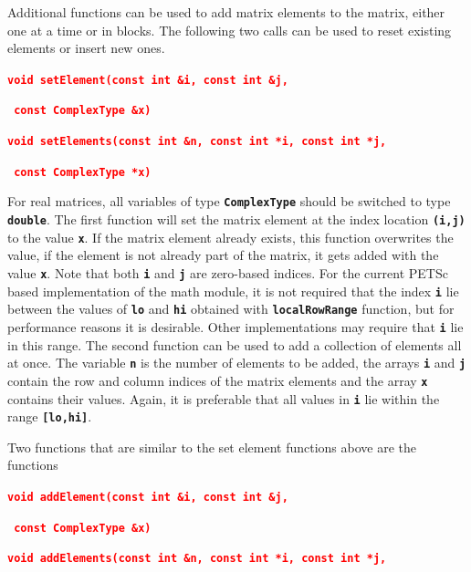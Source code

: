 \documentclass[12pt]{report} %
\begin{document}
Additional functions can be used to add matrix elements to the matrix, either one at a time or in blocks. The following two calls can be used to reset existing elements or insert new ones.

\textcolor{red}{\texttt{\textbf{void setElement(const int \&i, const int \&j,}}}

\textcolor{red}{\texttt{\textbf{                const ComplexType \&x)}}}

\textcolor{red}{\texttt{\textbf{}}}

\textcolor{red}{\texttt{\textbf{void setElements(const int \&n, const int *i, const int *j,}}}

\textcolor{red}{\texttt{\textbf{                 const ComplexType *x)}}}

For real matrices, all variables of type \texttt{\textbf{ComplexType}} should be switched to type \texttt{\textbf{double}}. The first function will set the matrix element at the index location \texttt{\textbf{(i,j)}} to the value \texttt{\textbf{x}}. If the matrix element already exists, this function overwrites the value, if the element is not already part of the matrix, it gets added with the value \texttt{\textbf{x}}. Note that both \texttt{\textbf{i}} and \texttt{\textbf{j}} are zero-based indices. For the current PETSc based implementation of the math module, it is not required that the index \texttt{\textbf{i}} lie between the values of \texttt{\textbf{lo}} and \texttt{\textbf{hi}} obtained with \texttt{\textbf{localRowRange}} function, but for performance reasons it is desirable. Other implementations may require that \texttt{\textbf{i}} lie in this range. The second function can be used to add a collection of elements all at once. The variable \texttt{\textbf{n}} is the number of elements to be added, the arrays \texttt{\textbf{i}} and \texttt{\textbf{j}} contain the row and column indices of the matrix elements and the array \texttt{\textbf{x}} contains their values. Again, it is preferable that all values in \texttt{\textbf{i}} lie within the range \texttt{\textbf{[lo,hi]}}.

Two functions that are similar to the set element functions above are the functions

\textcolor{red}{\texttt{\textbf{void addElement(const int \&i, const int \&j,}}}

\textcolor{red}{\texttt{\textbf{                const ComplexType \&x)}}}

\textcolor{red}{\texttt{\textbf{}}}

\textcolor{red}{\texttt{\textbf{void addElements(const int \&n, const int *i, const int *j,}}}
\end{document}
